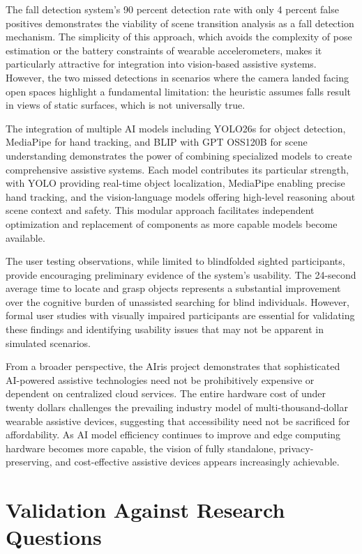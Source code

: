 \documentclass[12pt,a4paper]{report}
\begin{document}
The fall detection system's 90 percent detection rate with only 4 percent false positives demonstrates the viability of scene transition analysis as a fall detection mechanism. The simplicity of this approach, which avoids the complexity of pose estimation or the battery constraints of wearable accelerometers, makes it particularly attractive for integration into vision-based assistive systems. However, the two missed detections in scenarios where the camera landed facing open spaces highlight a fundamental limitation: the heuristic assumes falls result in views of static surfaces, which is not universally true.

The integration of multiple AI models including YOLO26s for object detection, MediaPipe for hand tracking, and BLIP with GPT OSS120B for scene understanding demonstrates the power of combining specialized models to create comprehensive assistive systems. Each model contributes its particular strength, with YOLO providing real-time object localization, MediaPipe enabling precise hand tracking, and the vision-language models offering high-level reasoning about scene context and safety. This modular approach facilitates independent optimization and replacement of components as more capable models become available.

The user testing observations, while limited to blindfolded sighted participants, provide encouraging preliminary evidence of the system's usability. The 24-second average time to locate and grasp objects represents a substantial improvement over the cognitive burden of unassisted searching for blind individuals. However, formal user studies with visually impaired participants are essential for validating these findings and identifying usability issues that may not be apparent in simulated scenarios.

From a broader perspective, the AIris project demonstrates that sophisticated AI-powered assistive technologies need not be prohibitively expensive or dependent on centralized cloud services. The entire hardware cost of under twenty dollars challenges the prevailing industry model of multi-thousand-dollar wearable assistive devices, suggesting that accessibility need not be sacrificed for affordability. As AI model efficiency continues to improve and edge computing hardware becomes more capable, the vision of fully standalone, privacy-preserving, and cost-effective assistive devices appears increasingly achievable.

\section{Validation Against Research Questions}
\end{document}
